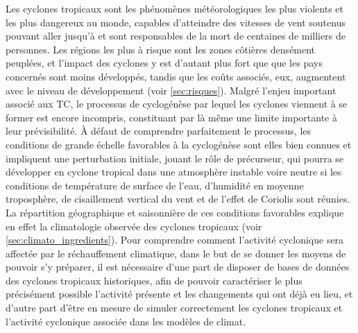 \documentclass[../main.tex]{subfiles}
\begin{document}
Les cyclones tropicaux sont les phénomènes météorologiques les plus violents et les plus dangereux au monde, capables d'atteindre des vitesses de vent soutenus
pouvant aller jusqu'à  et sont responsables de la mort de centaines de milliers de personnes. Les régions les plus à risque sont les zones côtières
densément peuplées, et l'impact des cyclones y est d'autant plus fort que que les pays concernés sont moins développés, tandis que les coûts associés, eux,
augmentent avec le niveau de développement (voir \cref{sec:risques}). Malgré l'enjeu important associé aux TC, le processus de cyclogénèse par lequel les
cyclones viennent à se former est encore incompris, constituant par là même une limite importante à leur prévisibilité. À défaut de comprendre parfaitement le
processus, les conditions de grande échelle favorables à la cyclogénèse sont elles bien connues et impliquent une perturbation initiale, jouant le rôle de
précurseur, qui pourra se développer en cyclone tropical dans une atmosphère instable voire neutre si les conditions de température de surface de l'eau,
d'humidité en moyenne troposphère, de cisaillement vertical du vent et de l'effet de Coriolis sont réunies. La répartition géographique et saisonnière de ces
conditions favorables explique en effet la climatologie observée des cyclones tropicaux (voir \cref{sec:climato_ingredients}). Pour comprendre comment
l'activité cyclonique sera affectée par le réchauffement climatique, dans le but de se donner les moyens de pouvoir s'y préparer, il est nécessaire d'une part
de disposer de bases de données des cyclones tropicaux historiques, afin de pouvoir caractériser le plus précisément possible l'activité présente et les
changements qui ont déjà eu lieu, et d'autre part d'être en mesure de simuler correctement les cyclones tropicaux et l'activité cyclonique associée dans les
modèles de climat.
\end{document}
